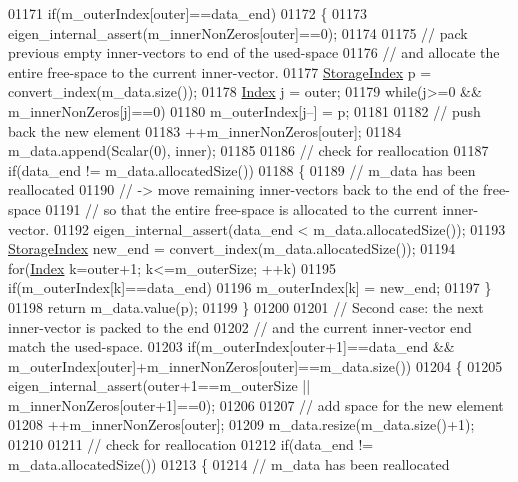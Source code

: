 \begin{DoxyCode}
01171   \textcolor{keywordflow}{if}(m\_outerIndex[outer]==data\_end)
01172   \{
01173     eigen\_internal\_assert(m\_innerNonZeros[outer]==0);
01174     
01175     \textcolor{comment}{// pack previous empty inner-vectors to end of the used-space}
01176     \textcolor{comment}{// and allocate the entire free-space to the current inner-vector.}
01177     \hyperlink{group___sparse_core___module_a0b540ba724726ebe953f8c0df06081ed}{StorageIndex} p = convert\_index(m\_data.size());
01178     \hyperlink{group___core___module_a554f30542cc2316add4b1ea0a492ff02}{Index} j = outer;
01179     \textcolor{keywordflow}{while}(j>=0 && m\_innerNonZeros[j]==0)
01180       m\_outerIndex[j--] = p;
01181     
01182     \textcolor{comment}{// push back the new element}
01183     ++m\_innerNonZeros[outer];
01184     m\_data.append(Scalar(0), inner);
01185     
01186     \textcolor{comment}{// check for reallocation}
01187     \textcolor{keywordflow}{if}(data\_end != m\_data.allocatedSize())
01188     \{
01189       \textcolor{comment}{// m\_data has been reallocated}
01190       \textcolor{comment}{//  -> move remaining inner-vectors back to the end of the free-space}
01191       \textcolor{comment}{//     so that the entire free-space is allocated to the current inner-vector.}
01192       eigen\_internal\_assert(data\_end < m\_data.allocatedSize());
01193       \hyperlink{group___sparse_core___module_a0b540ba724726ebe953f8c0df06081ed}{StorageIndex} new\_end = convert\_index(m\_data.allocatedSize());
01194       \textcolor{keywordflow}{for}(\hyperlink{group___core___module_a554f30542cc2316add4b1ea0a492ff02}{Index} k=outer+1; k<=m\_outerSize; ++k)
01195         \textcolor{keywordflow}{if}(m\_outerIndex[k]==data\_end)
01196           m\_outerIndex[k] = new\_end;
01197     \}
01198     \textcolor{keywordflow}{return} m\_data.value(p);
01199   \}
01200   
01201   \textcolor{comment}{// Second case: the next inner-vector is packed to the end}
01202   \textcolor{comment}{// and the current inner-vector end match the used-space.}
01203   \textcolor{keywordflow}{if}(m\_outerIndex[outer+1]==data\_end && m\_outerIndex[outer]+m\_innerNonZeros[outer]==m\_data.size())
01204   \{
01205     eigen\_internal\_assert(outer+1==m\_outerSize || m\_innerNonZeros[outer+1]==0);
01206     
01207     \textcolor{comment}{// add space for the new element}
01208     ++m\_innerNonZeros[outer];
01209     m\_data.resize(m\_data.size()+1);
01210     
01211     \textcolor{comment}{// check for reallocation}
01212     \textcolor{keywordflow}{if}(data\_end != m\_data.allocatedSize())
01213     \{
01214       \textcolor{comment}{// m\_data has been reallocated}

\end{DoxyCode}
